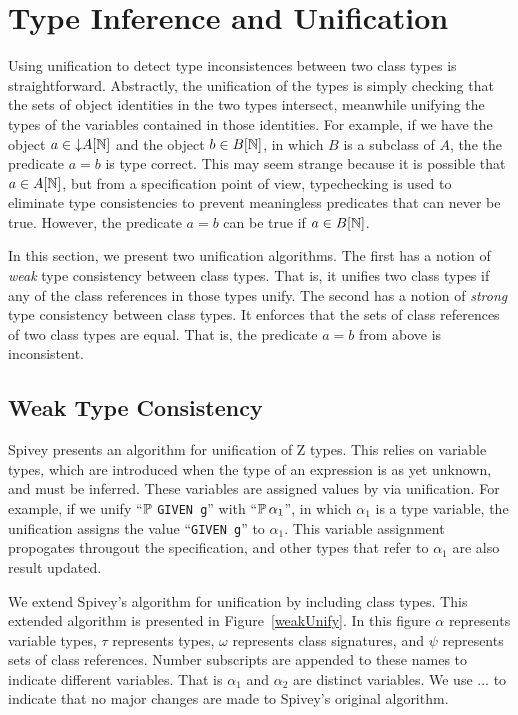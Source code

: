 \section{Type Inference and Unification}
\label{inference}

Using unification to detect type inconsistences between two class
types is straightforward.  Abstractly, the unification of the types is
simply checking that the sets of object identities in the two types
intersect, meanwhile unifying the types of the variables contained in
those identities. For example, if we have the object $a \in \mathord\downarrow
A[{\mathbb N}]$ and the object $b \in B[{\mathbb N}]$, in which $B$ is a subclass of
$A$, the the predicate $a = b$ is type correct. This may seem strange
because it is possible that $a \in A[{\mathbb N}]$, but from a specification
point of view, typechecking is used to eliminate type consistencies to
prevent meaningless predicates that can never be true. However, the
predicate $a = b$ can be true if $a \in B[{\mathbb N}]$.

In this section, we present two unification algorithms. The first has
a notion of {\em weak} type consistency between class types. That is,
it unifies two class types if any of the class references in those
types unify. The second has a notion of {\em strong} type consistency
between class types. It enforces that the sets of class references of
two class types are equal. That is, the predicate $a = b$ from above
is inconsistent. 

\subsection{Weak Type Consistency}

Spivey \cite{spivey90} presents an algorithm for unification of Z
types. This relies on variable types, which are introduced when the
type of an expression is as yet unknown, and must be
inferred. These variables are assigned values by via unification. For
example, if we unify ``$\power$ {\tt GIVEN g}'' with ``$\power \alpha_1$'', in
which $\alpha_1$ is a type variable, the unification assigns the value
``{\tt GIVEN g}'' to $\alpha_1$. This variable assignment propogates
througout the specification, and other types that refer to $\alpha_1$
are also result updated.

We extend Spivey's algorithm for unification by including class
types. This extended algorithm is presented in
Figure~\ref{weakUnify}. In this figure $\alpha$ represents variable
types, $\tau$ represents types, $\omega$ represents class signatures,
and $\psi$ represents sets of class references. Number subscripts are
appended to these names to indicate different variables. That is
$\alpha_1$ and $\alpha_2$ are distinct variables. We use $...$ to
indicate that no major changes are made to Spivey's original
algorithm.

